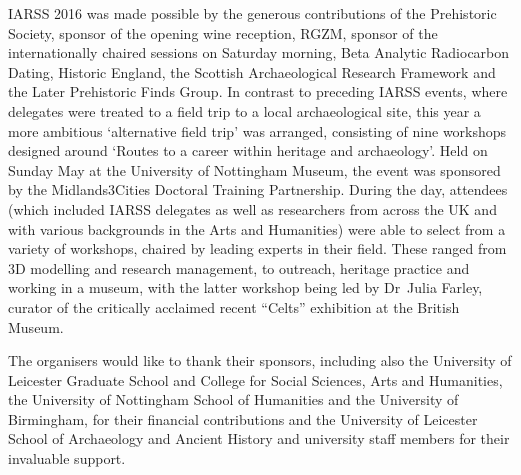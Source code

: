 \documentclass[ngerman,english]{ijsra}
\begin{document}
IARSS 2016 was made possible by the generous contributions of the Prehistoric Society, sponsor of the opening wine reception, 
RGZM, 
sponsor of the internationally chaired sessions on Saturday morning, 
Beta Analytic Radiocarbon Dating, Historic England, the Scottish Archaeological Research Framework and the Later Prehistoric Finds Group. 
In contrast to preceding IARSS events, where delegates were treated to a field trip to a local archaeological site, this year a more ambitious ‘alternative field trip’ was arranged, consisting of nine workshops designed around ‘Routes to a career within heritage and archaeology’. 
Held on Sunday  May at the University of Nottingham Museum, the event was sponsored by the Midlands3Cities Doctoral Training Partnership. 
During the day, attendees (which included IARSS delegates as well as researchers from across the UK and with various backgrounds in the Arts and Humanities) were able to select from a variety of workshops, chaired by leading experts in their field. These ranged from 3D modelling and research management, to outreach, heritage practice and working in a museum, with the latter workshop being led by Dr~Julia Farley, curator of the critically acclaimed recent \enquote{Celts} exhibition at the British Museum.

The organisers would like to thank their sponsors, including also the University of Leicester Graduate School and College for Social Sciences, Arts and Humanities, the University of Nottingham School of Humanities and the University of Birmingham, for their financial contributions and the University of Leicester School of Archaeology and Ancient History and university staff members for their invaluable support. 


\IJSRAclosing%
\end{document}
